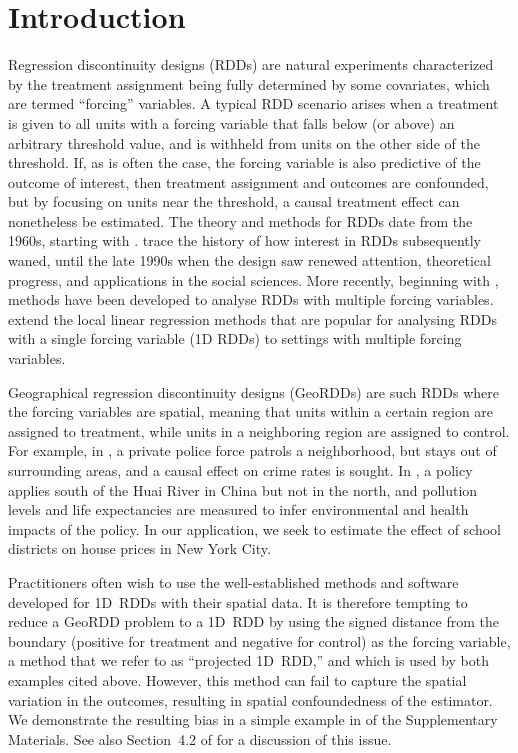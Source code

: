 \section{Introduction}\label{introduction}

Regression discontinuity designs (RDDs) are natural experiments characterized by the treatment assignment being fully determined by some covariates, which are termed ``forcing'' variables.
A typical RDD scenario arises when a treatment is given to all units with a forcing variable that falls below (or above) an arbitrary threshold value, and is withheld from units on the other side of the threshold.
If, as is often the case, the forcing variable is also predictive of the outcome of interest, then treatment assignment and outcomes are confounded, but by focusing on units near the threshold, a causal treatment effect can nonetheless be estimated.
The theory and methods for RDDs date from the 1960s, starting with \cite{thistlethwaite1960regression}.
\cite{cook2008waiting} trace the history of how interest in RDDs subsequently waned, until the late 1990s when the design saw renewed attention, theoretical progress, and applications in the social sciences.
More recently, beginning with \cite{papay2011extending}, methods have been developed to analyse RDDs with multiple forcing variables.
\cite{imbens2011regression} extend the local linear regression methods \citep[see][]{imbensrdd} that are popular for analysing RDDs with a single forcing variable (1D RDDs) to settings with multiple forcing variables.

Geographical regression discontinuity designs (GeoRDDs) are such RDDs where the forcing variables are spatial,
meaning that units within a certain region are assigned to treatment, while units in a neighboring region are assigned to control.
For example, in \cite{macdonald2015effect}, a private police force patrols a neighborhood, but stays out of surrounding areas, and a causal effect on crime rates is sought.
In \cite{chen2013evidence}, a policy applies south of the Huai River in China but not in the north, and pollution levels and life expectancies are measured to infer environmental and health impacts of the policy.
In our application, we seek to estimate the effect of school districts on house prices in New York City.

Practitioners often wish to use the well-established methods and software developed for 1D~RDDs with their spatial data.
It is therefore tempting to reduce a GeoRDD problem to a 1D~RDD by using the signed distance from the boundary (positive for treatment and negative for control) as the forcing variable, a method that we refer to as ``projected 1D~RDD,'' and which is used by both examples cited above.
However, this method can fail to capture the spatial variation in the outcomes, resulting in spatial confoundedness of the estimator.
We demonstrate the resulting bias in a simple example in  of the Supplementary Materials.
See also Section~4.2 of \cite{keele_titiunik_2015} for a discussion of this issue.

